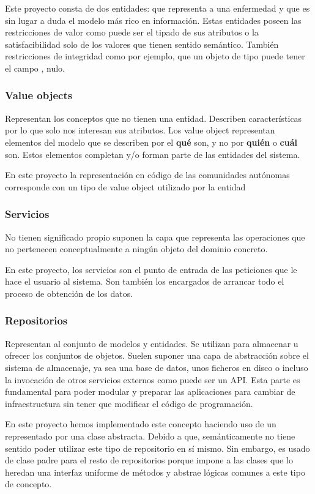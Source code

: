 Este proyecto consta de dos entidades:  que representa a una enfermedad y  que es sin lugar a duda el modelo más rico en información. Estas entidades poseen las restricciones de valor como puede ser el tipado de sus atributos o la satisfacibilidad solo de los valores que tienen sentido semántico. También restricciones de integridad como por ejemplo, que un objeto de tipo  puede tener el campo , nulo.

\subsubsection{Value objects}
Representan los conceptos que no tienen una entidad. Describen características por lo que solo nos interesan sus atributos.
Los value object representan elementos del modelo que se describen por el \textbf{qué} son, y no por \textbf{quién} o \textbf{cuál} son. Estos elementos completan y/o forman parte de las entidades del sistema.

En este proyecto la representación en código de las comunidades autónomas corresponde con un tipo de value object utilizado por la entidad 

\subsubsection{Servicios}
No tienen significado propio suponen la capa que representa las operaciones que no pertenecen conceptualmente a ningún objeto del dominio concreto. 

En este proyecto, los servicios son el punto de entrada de las peticiones que le hace el usuario al sistema. Son también los encargados de arrancar todo el proceso de obtención de los datos.

\subsubsection{Repositorios}
Representan al conjunto de modelos y entidades. Se utilizan para almacenar u ofrecer los conjuntos de objetos. Suelen suponer una capa de abstracción sobre el sistema de almacenaje, ya sea una base de datos, unos ficheros en disco o incluso la invocación de otros servicios externos como puede ser un API. Esta parte es fundamental para poder modular y preparar las aplicaciones para cambiar de infraestructura sin tener que modificar el código de programación.

En este proyecto hemos implementado este concepto haciendo uso de un  representado por una clase abstracta. Debido a que, semánticamente no tiene sentido poder utilizar este tipo de repositorio en sí mismo. Sin embargo, es usado de clase padre para el resto de repositorios porque impone a las clases que lo heredan una interfaz uniforme de métodos y abstrae lógicas comunes a este tipo de concepto.

